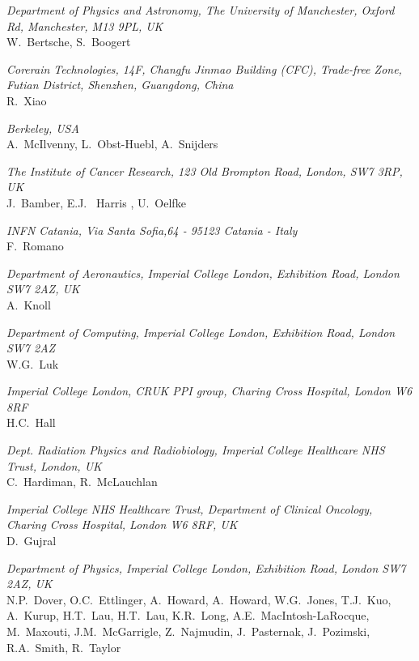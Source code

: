 \vspace{0.5cm}
\noindent \textit{Department of Physics and Astronomy, The University of Manchester, Oxford Rd, Manchester, M13 9PL, UK} \\
W.~Bertsche, S.~Boogert
 
\vspace{0.5cm}
\noindent \textit{Corerain Technologies, 14F, Changfu Jinmao Building (CFC), Trade-free Zone, Futian District, Shenzhen, Guangdong, China} \\
R.~Xiao
 
\vspace{0.5cm}
\noindent \textit{Berkeley, USA} \\
A.~McIlvenny, L.~Obst-Huebl, A.~Snijders
 
\vspace{0.5cm}
\noindent \textit{The Institute of Cancer Research, 123 Old Brompton Road, London, SW7 3RP, UK} \\
J.~Bamber, E.J. ~Harris , U.~Oelfke
 
\vspace{0.5cm}
\noindent \textit{INFN Catania, Via Santa Sofia,64 - 95123 Catania - Italy} \\
F.~Romano
 
\vspace{0.5cm}
\noindent \textit{Department of Aeronautics, Imperial College London, Exhibition Road, London SW7 2AZ, UK} \\
A.~Knoll
 
\vspace{0.5cm}
\noindent \textit{Department of Computing, Imperial College London, Exhibition Road, London SW7 2AZ} \\
W.G.~Luk
 
\vspace{0.5cm}
\noindent \textit{Imperial College London, CRUK PPI group, Charing Cross Hospital, London W6 8RF} \\
H.C.~Hall
 
\vspace{0.5cm}
\noindent \textit{Dept. Radiation Physics and Radiobiology, Imperial College Healthcare NHS Trust, London, UK} \\
C.~Hardiman, R.~McLauchlan
 
\vspace{0.5cm}
\noindent \textit{Imperial College NHS Healthcare Trust, Department of Clinical Oncology, Charing Cross Hospital, London W6 8RF, UK} \\
D.~Gujral
 
\vspace{0.5cm}
\noindent \textit{Department of Physics, Imperial College London, Exhibition Road, London SW7 2AZ, UK} \\
N.P.~Dover, O.C.~Ettlinger, A.~Howard, A.~Howard, W.G.~Jones, T.J.~Kuo, A.~Kurup, H.T.~Lau, H.T.~Lau, K.R.~Long, A.E.~MacIntosh-LaRocque, M.~Maxouti, J.M.~McGarrigle, Z.~Najmudin, J.~Pasternak, J.~Pozimski, R.A.~Smith, R.~Taylor
 
